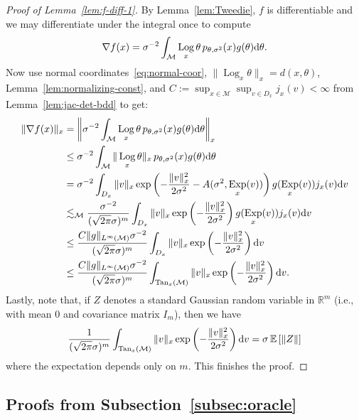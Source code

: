 \documentclass[preprint]{imsart}
\theoremstyle{plain}
\theoremstyle{definition}
\newcommand{\Rbb}{\mathbb{R}}
\newcommand{\Ebb}{\mathbb{E}}
\newcommand{\Mcal}{\mathcal{M}}
\newcommand{\diff}{\textnormal{d}}
\DeclareMathOperator{\Tan}{Tan}
\DeclareMathOperator{\Log}{Log}
\DeclareMathOperator{\Exp}{Exp}
\begin{document}
\begin{appendix}
\begin{proof}[Proof of Lemma~\ref{lem:f-diff-1}]
By Lemma~\ref{lem:Tweedie}, $f$ is differentiable and we may differentiate under the integral once to compute 
    \begin{equation*}
        \nabla f(x) = \sigma^{-2}\int_{\Mcal}\Log_x\theta \,p_{\theta,\sigma^2}(x)g(\theta)\diff\theta.
    \end{equation*}
    Now use normal coordinates~\eqref{eq:normal-coor}, $\|\Log_x\theta\|_x =d(x,\theta)$, Lemma~\ref{lem:normalizing-const}, and $C:=\sup_{x\in\Mcal}\sup_{v\in D_x}j_x(v)<\infty$ from Lemma~\ref{lem:jac-det-bdd} to get:
    \begin{align*}
        \|\nabla f(x)\|_x &= \left\|\sigma^{-2}\int_{\Mcal}\Log_x\theta \,p_{\theta,\sigma^2}(x)g(\theta)\diff\theta\right\|_x \\
        &\le \sigma^{-2}\int_{\Mcal}\|\Log_x\theta\|_x \,p_{\theta,\sigma^2}(x)g(\theta)\diff\theta \\
        &= \sigma^{-2}\int_{D_x}\|v\|_x\exp\left(-\frac{\|v\|_x^2}{2\sigma^2}-A(\sigma^2,\Exp_x(v))\right)g(\Exp_x(v))j_x(v)\diff v \\
        &\lesssim_{\Mcal} \frac{\sigma^{-2}}{(\sqrt{2\pi}\sigma)^m}\int_{D_x}\|v\|_x\exp\left(-\frac{\|v\|_x^2}{2\sigma^2}\right)g(\Exp_x(v))j_x(v)\diff v \\
        &\le \frac{C\|g\|_{L^{\infty}(\Mcal)}\sigma^{-2}}{(\sqrt{2\pi}\sigma)^m}\int_{D_x}\|v\|_x\exp\left(-\frac{\|v\|_x^2}{2\sigma^2}\right)\diff v \\
        &\le \frac{C\|g\|_{L^{\infty}(\Mcal)}\sigma^{-2}}{(\sqrt{2\pi}\sigma)^m}\int_{\Tan_x(\Mcal)}\|v\|_x\exp\left(-\frac{\|v\|_x^2}{2\sigma^2}\right)\diff v.
    \end{align*}
    Lastly, note that, if $Z$ denotes a standard Gaussian random variable in $\Rbb^m$ (i.e., with mean 0 and covariance matrix $I_m$), then we have
    \begin{equation*}
        \frac{1}{(\sqrt{2\pi}\sigma)^m}\int_{\Tan_x(\Mcal)}\|v\|_x\exp\left(-\frac{\|v\|_x^2}{2\sigma^2}\right)\diff v = \sigma\,\Ebb\left[\|Z\|\right]
    \end{equation*}
    where the expectation depends only on $m$.
    This finishes the proof.
    \end{proof}

\subsection{Proofs from Subsection~\ref{subsec:oracle}}\label{subsec:proofs-oracle}


\end{appendix}
\end{document}
